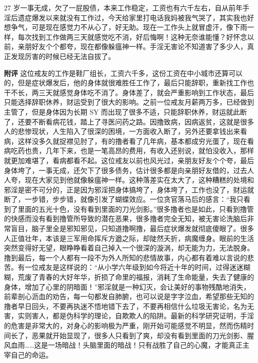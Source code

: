 \begin{case}
    27 岁一事无成，欠了一屁股债，本来工作稳定，工资也有六千左右，自从前年手淫后遗症爆发以来就没有工作过，今天给家里打电话我妈被我气哭了，其实我也好想争气，可是现在感觉力不从心了，好无助。现在一工作头上就冒虚汗，像下雨一样，每次找到工作做两三天就感觉吃不消，好后悔啊！这种无奈谁能懂？好怀念以前，亲朋好友个个都夸，现在都像躲瘟神一样。手淫无害论不知道害了多少人，真正发现厉害的时候已经无法自拔了。

    \textbf{附评} 这位戒友的工作是鞋厂组长，工资六千多，这份工资在中小城市还算可以的，但是症状爆发后，他的身体就很难胜任工作了，最后只能辞职，重新找工作也干不长，两三天就感觉身体吃不消了。身体差了，就会严重影响到工作状态，最后只能选择辞职休养，财运受到了很大的影响。之前一位戒友月薪两万多，已经做到主管了，但是身体因为长期 SY 而出现了很多不适，只能辞职休养，财运就此断了，还要不断看病花钱，踏上了寻医问药之路。因撸致病，因病返贫，这就是很多人的悲惨现状，人生陷入了很深的困境，一方面收入断了，另外还要拿钱出来看病，这样没多久就捉襟见肘了，有的撸者看了几年病，基本都成穷光蛋了，现在看病吃药也贵，几年下来，也是一笔高昂的费用，有收入还别说，就怕没收入，那样就更加难堪了，看病都看不起。这位戒友以前也风光过，亲朋友好友个个夸，最后身体垮了，一事无成，还欠下了很多债务，估计很多都是向亲朋好友借的，过去人人夸，现在大家见到他就像躲瘟神一样。这种落差实在太大了，这种糟糕的处境和邪淫是密不可分的，正是因为邪淫把身体搞垮了，身体垮了，工作也没了，财运就断了，一步错，步步错，就像引发了蝴蝶效应。一位贪官落马后的感言：“我只看到了里面的五光十色，没有看到里面的刀光剑影。”很多撸者也是如此，只看到撸管的快感而没有看到撸管所导致的潜在恶果，很多撸者完全无知，被无害论洗脑后非常盲目，脑子里全是邪知邪见，只知道撸啊撸，最后症状爆发就彻底傻眼了。很多人正值壮年，本该是三军用命挥斥方遒之际，却陡然夭折，病魔缠身。眼前的生活突然变得好无望，眼睁睁看着自己掉入一个很深的漩涡，却无能为力，无法脱身。撸到最后，每一个人都有一段不为外人所知的悲情故事，内心都有着难以言说的悲苦。有一位戒友是这样说的：“从小学六年级到如今将近十年的时间，过得迷迷糊糊，荒废了青春的大好年华，折损了命里的福报，消耗了生命能量，失去了健康的身体，增加了心里的阴暗面！”邪淫就是一种幻灭，会让美好的事物残酷地消失，前辈剖心沥血的劝告，每一句都发自肺腑，也可以说是字字泣血，希望那些无知的撸者早日回头，不要再执迷不悟地错下去了，不要再相信什么垃圾无害论，名为无害，实则害人，都是伪科学的理论，自欺欺人的陷阱。最新的科学研究证明，手淫的危害是非常大的，对身心的影响极为严重，刚开始可能感觉不明显，然而伤精时间长了，恶果就开始显现了，很多人只看到了爽，却没有看到里面的刀光剑影、腥风血雨……这是一场暗战！头脑里面的暗战！只有战胜了自己的心魔，才能真正主宰自己的命运。
\end{case}

